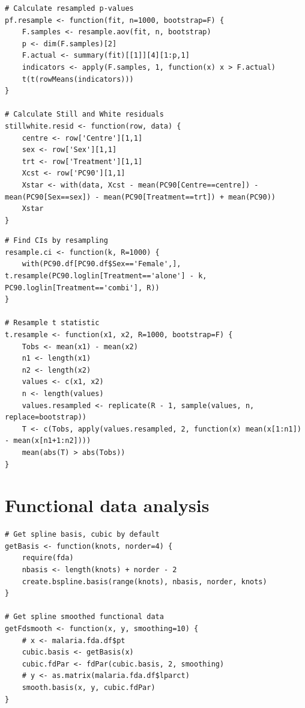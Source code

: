 \begin{singlespace}
\begin{lstlisting}[caption=Functions to calculate resampled $p$-values and resampling residuals,label=R:resampmisc]
# Calculate resampled p-values
pf.resample <- function(fit, n=1000, bootstrap=F) {
	F.samples <- resample.aov(fit, n, bootstrap)
	p <- dim(F.samples)[2]
	F.actual <- summary(fit)[[1]][4][1:p,1]
	indicators <- apply(F.samples, 1, function(x) x > F.actual)
	t(t(rowMeans(indicators)))
}

# Calculate Still and White residuals
stillwhite.resid <- function(row, data) {
	centre <- row['Centre'][1,1]
	sex <- row['Sex'][1,1]
	trt <- row['Treatment'][1,1]
	Xcst <- row['PC90'][1,1]
	Xstar <- with(data, Xcst - mean(PC90[Centre==centre]) - mean(PC90[Sex==sex]) - mean(PC90[Treatment==trt]) + mean(PC90))
	Xstar
}
\end{lstlisting}

\begin{lstlisting}[caption=Functions to calculate confidence intervals by resampling,label=R:resampCI]
# Find CIs by resampling
resample.ci <- function(k, R=1000) {
	with(PC90.df[PC90.df$Sex=='Female',], t.resample(PC90.loglin[Treatment=='alone'] - k, PC90.loglin[Treatment=='combi'], R))
}

# Resample t statistic
t.resample <- function(x1, x2, R=1000, bootstrap=F) {
	Tobs <- mean(x1) - mean(x2)
	n1 <- length(x1)
	n2 <- length(x2)
	values <- c(x1, x2)
	n <- length(values)
	values.resampled <- replicate(R - 1, sample(values, n, replace=bootstrap))
	T <- c(Tobs, apply(values.resampled, 2, function(x) mean(x[1:n1]) - mean(x[n1+1:n2])))
	mean(abs(T) > abs(Tobs))
}
\end{lstlisting}

\section{Functional data analysis}\label{R:fda}
\begin{lstlisting}[caption=Functions for cubic spline smoothing,label=R:fdsmooth]
# Get spline basis, cubic by default
getBasis <- function(knots, norder=4) {
	require(fda)
	nbasis <- length(knots) + norder - 2
	create.bspline.basis(range(knots), nbasis, norder, knots)
}

# Get spline smoothed functional data
getFdsmooth <- function(x, y, smoothing=10) {
	# x <- malaria.fda.df$pt
	cubic.basis <- getBasis(x)
	cubic.fdPar <- fdPar(cubic.basis, 2, smoothing)
	# y <- as.matrix(malaria.fda.df$lparct)
	smooth.basis(x, y, cubic.fdPar)
}
\end{lstlisting}


\end{singlespace}
